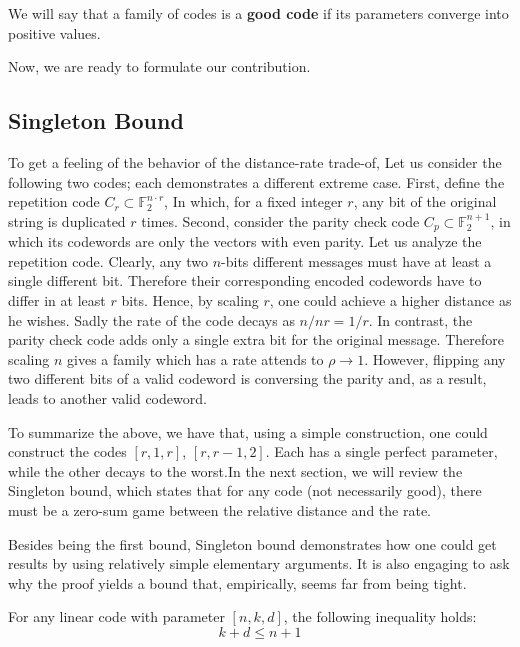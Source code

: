   \begin{definition} \label{good-code} We will say that a family of codes is a \textbf{good code} if its parameters converge into positive values. 
  \end{definition}

  \ifdefined\LDPCLTC
\fi

  
\ifdefined\LDPCLTC
  Now, we are ready to formulate our contribution. 

\fi

  \subsection{Singleton Bound}  
  To get a feeling of the behavior of the distance-rate trade-of, Let us consider the following two codes; each demonstrates a different extreme case. First, define the repetition code $C_{r} \subset \mathbb{F}_{2}^{n \cdot r}$, In which, for a fixed integer $r$, any bit of the original string is duplicated $r$ times. Second, consider the parity check code $C_{p} \subset \mathbb{F}_{2}^{n+1}$, in which its codewords are only the vectors with even parity. Let us analyze the repetition code. Clearly, any two $n$-bits different messages must have at least a single different bit. Therefore their corresponding encoded codewords have to differ in at least $r$ bits. Hence, by scaling $r$, one could achieve a higher distance as he wishes. Sadly the rate of the code decays as $n/nr = 1/r$. In contrast, the parity check code adds only a single extra bit for the original message. Therefore scaling $n$ gives a family which has a rate attends to $\rho \rightarrow 1$. However, flipping any two different bits of a valid codeword is conversing the parity and, as a result, leads to another valid codeword.

  To summarize the above, we have that, using a simple construction, one could construct the codes $[r, 1, r]$, $[r, r-1, 2]$. Each has a single perfect parameter, while the other decays to the worst.\ifdefined\LDPCLTC In the next section, we will review the Singleton bound, which states that for any code (not necessarily good), there must be a zero-sum game between the relative distance and the rate.
\fi %

  Besides being the first bound, Singleton bound demonstrates how one could get results by using relatively simple elementary arguments. It is also engaging to ask why the proof yields a bound that, empirically, seems far from being tight.
  \begin{theorem*}\label{theorem*:Sing}  For any linear code with parameter $[n,k,d]$, the following inequality holds:
  \begin{equation*}
    k+ d \le n + 1
  \end{equation*} 
  \end{theorem*}

